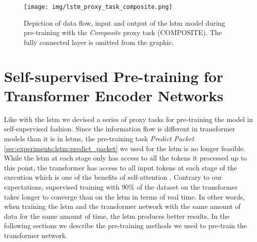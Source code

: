 \begin{figure}[]
	\centering
	\texttt{[image: img/lstm\_proxy\_task\_composite.png]}
	\caption{Depiction of data flow, input and output of the \gls{lstm} model during pre-training with the \textit{Composite} proxy task (COMPOSITE). The fully connected layer is omitted from the graphic. }
	\label{fig:experiments:unsupervised_lstm_composite}
\end{figure}	

\FloatBarrier

\section{Self-supervised Pre-training for Transformer Encoder Networks} \label{sec:experiments:transformer}

Like with the \gls{lstm} we devised a series of proxy tasks for pre-training the model in self-supervised fashion. Since the information flow is different in transformer models than it is in \glspl{lstm}, the pre-training task \textit{Predict Packet} \ref{sec:experiments:lstm:predict_packet} we used for the \gls{lstm} is no longer feasible. While the \gls{lstm} at each stage only has access to all the tokens it processed up to this point, the transformer has access to all input tokens at each stage of the execution which is one of the benefits of self-attention \cite{attention}. Contrary to our expectations, supervised training with 90\% of the dataset on the transformer takes longer to converge than on the \gls{lstm} in terms of real time. In other words, when training the \gls{lstm} and the transformer network with the same amount of data for the same amount of time, the \gls{lstm} produces better results. In the following sections we describe the pre-training methods we used to pre-train the transformer network.

